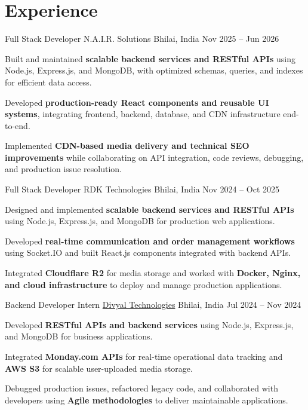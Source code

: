 \section*{Experience}

\experience
  {Full Stack Developer}
  {N.A.I.R. Solutions}
  {Bhilai, India}
  {Nov 2025 -- Jun 2026}
  {
    \item Built and maintained \textbf{scalable backend services and RESTful APIs} using Node.js, Express.js, and MongoDB, with optimized schemas, queries, and indexes for efficient data access.
    \item Developed \textbf{production-ready React components and reusable UI systems}, integrating frontend, backend, database, and CDN infrastructure end-to-end.
    \item Implemented \textbf{CDN-based media delivery and technical SEO improvements} while collaborating on API integration, code reviews, debugging, and production issue resolution.
  }

\experience
  {Full Stack Developer}
  {RDK Technologies}
  {Bhilai, India}
  {Nov 2024 -- Oct 2025}
  {
    \item Designed and implemented \textbf{scalable backend services and RESTful APIs} using Node.js, Express.js, and MongoDB for production web applications.
    \item Developed \textbf{real-time communication and order management workflows} using Socket.IO and built React.js components integrated with backend APIs.
    \item Integrated \textbf{Cloudflare R2} for media storage and worked with \textbf{Docker, Nginx, and cloud infrastructure} to deploy and manage production applications.
  }

\experience
  {Backend Developer Intern}
  {\href{https://www.divyaltech.com/}{Divyal Technologies}}
  {Bhilai, India}
  {Jul 2024 -- Nov 2024}
  {
    \item Developed \textbf{RESTful APIs and backend services} using Node.js, Express.js, and MongoDB for business applications.
    \item Integrated \textbf{Monday.com APIs} for real-time operational data tracking and \textbf{AWS S3} for scalable user-uploaded media storage.
    \item Debugged production issues, refactored legacy code, and collaborated with developers using \textbf{Agile methodologies} to deliver maintainable applications.
  }



